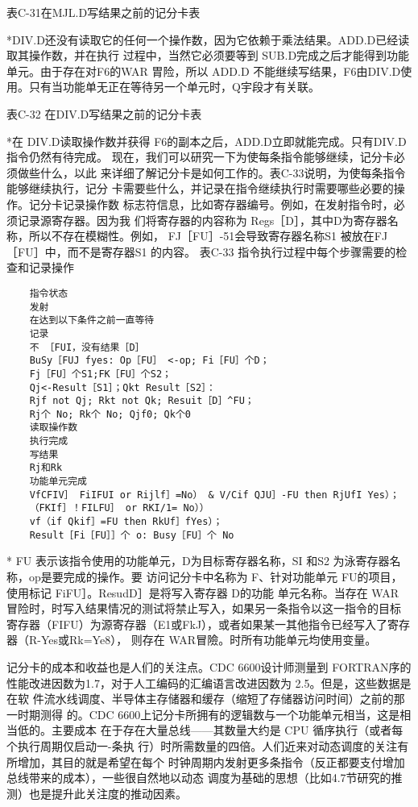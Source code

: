 表C-31在MJL.D写结果之前的记分卡表

*DIV.D还没有读取它的任何一个操作数，因为它依赖于乘法结果。ADD.D已经读取其操作数，并在执行
过程中，当然它必须要等到 SUB.D完成之后才能得到功能单元。由于存在对F6的WAR 胃险，所以 ADD.D
不能继续写结果，F6由DIV.D使用。只有当功能单无正在等待另一个单元时，Q宇段才有关联。

表C-32 在DIV.D写结果之前的记分卡表

*在 DIV.D读取操作数并获得 F6的副本之后，ADD.D立即就能完成。只有DIV.D指令仍然有待完成。
现在，我们可以研究一下为使每条指令能够继续，记分卡必须做些什么，以此
来详细了解记分卡是如何工作的。表C-33说明，为使每条指令能够继续执行，记分
卡需要些什么，并记录在指令继续执行时需要哪些必要的操作。记分卡记录操作数
标志符信息，比如寄存器编号。例如，在发射指令时，必须记录源寄存器。因为我
们将寄存器的内容称为 Regs［D］，其中D为寄存器名称，所以不存在模糊性。例如，
FJ［FU］-51会导致寄存器名称S1 被放在FJ［FU］中，而不是寄存器S1 的内容。
表C-33 指令执行过程中每个步骤需要的检查和记录操作

\begin{verbatim}
    指令状态
    发射
    在达到以下条件之前一直等待
    记录
    不 ［FUI，没有结果［D］
    BuSy［FUJ fyes: Op［FU］ <-op; Fi［FU］个D；
    Fj［FU］个S1;FK［FU］个S2；
    Qj<-Result［S1］；Qkt Result［S2］：
    Rjf not Qj; Rkt not Qk; Resuit［D］^FU；
    Rj个 No; Rk个 No; Qjf0; Qk个0
    读取操作数
    执行完成
    写结果
    Rj和Rk
    功能单元完成
    VfCFIV］ FiIFUI or Rijlf］=No） & V/Cif QJU］-FU then RjUfI Yes）；
    （FKIf］！FILFU］ or RKI/1= No））
    vf（if Qkif］=FU then RkUf］fYes）；
    Result［Fi［FU］］个 o: Busy［FU］个 No
\end{verbatim}
* FU 表示该指令使用的功能单元，D为目标寄存器名称，SI 和S2 为泳寄存器名称，op是要完成的操作。要
访问记分卡中名称为 F、针对功能单元 FU的项目，使用标记 FiFU］。ResudD］是将写入寄存器 D的功能
单元名称。当存在 WAR 冒险时，时写入结果情况的测试将禁止写入，如果另一条指令以这一指令的目标
寄存器（FIFU）为源寄存器（E1或FkJ），或者如果某一其他指令已经写入了寄存器（R-Yes或Rk=Ye8），
则存在 WAR冒險。时所有功能单元均使用变量。

记分卡的成本和收益也是人们的关注点。CDC 6600设计师测量到 FORTRAN序的
性能改进因数为1.7，对于人工编码的汇编语言改进因数为 2.5。但是，这些数据是在软
件流水线调度、半导体主存储器和缓存（缩短了存储器访问时间）之前的那一时期测得
的。CDC 6600上记分卡所拥有的逻辑数与一个功能单元相当，这是相当低的。主要成本
在于存在大量总线——其数量大约是 CPU 循序执行（或者每个执行周期仅启动一-条执
行）时所需数量的四倍。人们近来对动态调度的关注有所增加，其目的就是希望在每个
时钟周期内发射更多条指令（反正都要支付增加总线带来的成本），一些很自然地以动态
调度为基础的思想（比如4.7节研究的推测）也是提升此关注度的推动因素。


